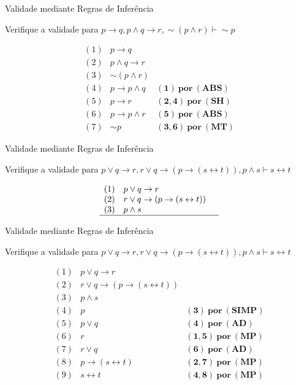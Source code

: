 \begin{frame}[t]{Validade mediante Regras de Inferência}

	Verifique a validade para $p \rightarrow q, p \wedge q \rightarrow r, \sim (p \wedge r) \vdash \sim p$
	
	\vskip 1.5cm
	
	$$\begin{array}{lll}
	(1) & p \rightarrow q  & \\
	(2) & p \wedge q \rightarrow r & \\
	(3) & \sim (p \wedge r) & \\
	\hline
	(4) & p \rightarrow p \wedge q & \mathbf{(1)~por~(ABS)} \\
	(5) & p \rightarrow r & \mathbf{(2,4)~por~(SH)} \\
	(6) & p \rightarrow p \wedge r & \mathbf{(5)~por~(ABS)} \\
	(7) & \sim p & \mathbf{(3,6)~por~(MT)}
	\end{array}$$	
\end{frame}


\begin{frame}[t]{Validade mediante Regras de Inferência}

	Verifique a validade para $p \vee q\rightarrow r, r \vee q \rightarrow (p \rightarrow (s \leftrightarrow t)), p \wedge s \vdash s \leftrightarrow t$
	
	\vskip 1.5cm
	
	$$\begin{array}{lll}
	(1) & p \vee q\rightarrow r  & \\
	(2) & r \vee q \rightarrow (p \rightarrow (s \leftrightarrow t)) & \\
	(3) & p \wedge s & \\
	\hline
	\end{array}$$	
\end{frame}


\begin{frame}[t]{Validade mediante Regras de Inferência}

	Verifique a validade para $p \vee q\rightarrow r, r \vee q \rightarrow (p \rightarrow (s \leftrightarrow t)), p \wedge s \vdash s \leftrightarrow t$
	
	\vskip 1.5cm
	
	$$\begin{array}{lll}
	(1) & p \vee q\rightarrow r  & \\
	(2) & r \vee q \rightarrow (p \rightarrow (s \leftrightarrow t)) & \\
	(3) & p \wedge s & \\
	\hline
	(4) & p & \mathbf{(3)~por~(SIMP)} \\
	(5) & p \vee q & \mathbf{(4)~por~(AD)} \\
	(6) & r & \mathbf{(1,5)~por~(MP)} \\
	(7) & r \vee q & \mathbf{(6)~por~(AD)} \\
	(8) & p \rightarrow (s \leftrightarrow t) & \mathbf{(2,7)~por~(MP)} \\
	(9) & s \leftrightarrow t & \mathbf{(4,8)~por~(MP)}
	\end{array}$$	
\end{frame}


